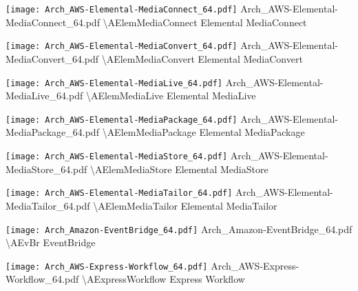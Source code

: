  {\texttt{[image: Arch\_AWS-Elemental-MediaConnect\_64.pdf]}} {Arch\_AWS-Elemental-MediaConnect\_64.pdf} {{\textbackslash}AElemMediaConnect} {Elemental MediaConnect}

 {\texttt{[image: Arch\_AWS-Elemental-MediaConvert\_64.pdf]}} {Arch\_AWS-Elemental-MediaConvert\_64.pdf} {{\textbackslash}AElemMediaConvert} {Elemental MediaConvert}

 {\texttt{[image: Arch\_AWS-Elemental-MediaLive\_64.pdf]}} {Arch\_AWS-Elemental-MediaLive\_64.pdf} {{\textbackslash}AElemMediaLive} {Elemental MediaLive}

 {\texttt{[image: Arch\_AWS-Elemental-MediaPackage\_64.pdf]}} {Arch\_AWS-Elemental-MediaPackage\_64.pdf} {{\textbackslash}AElemMediaPackage} {Elemental MediaPackage}

 {\texttt{[image: Arch\_AWS-Elemental-MediaStore\_64.pdf]}} {Arch\_AWS-Elemental-MediaStore\_64.pdf} {{\textbackslash}AElemMediaStore} {Elemental MediaStore}

 {\texttt{[image: Arch\_AWS-Elemental-MediaTailor\_64.pdf]}} {Arch\_AWS-Elemental-MediaTailor\_64.pdf} {{\textbackslash}AElemMediaTailor} {Elemental MediaTailor}

 {\texttt{[image: Arch\_Amazon-EventBridge\_64.pdf]}} {Arch\_Amazon-EventBridge\_64.pdf} {{\textbackslash}AEvBr} {EventBridge}

 {\texttt{[image: Arch\_AWS-Express-Workflow\_64.pdf]}} {Arch\_AWS-Express-Workflow\_64.pdf} {{\textbackslash}AExpressWorkflow} {Express Workflow}

